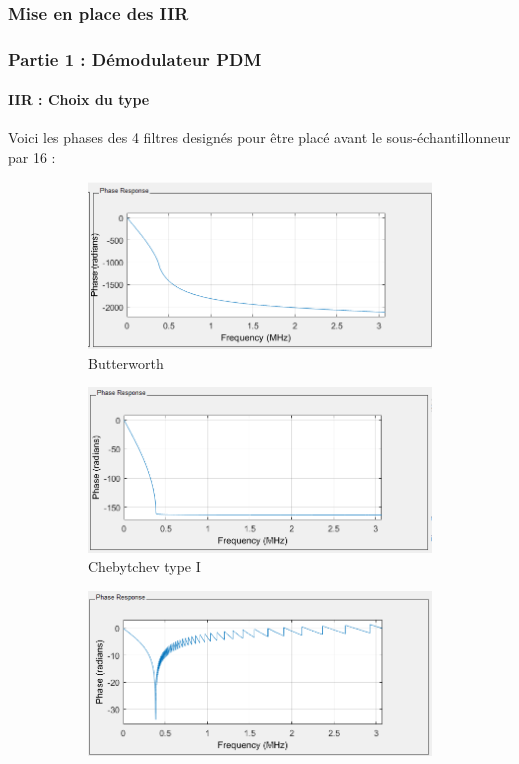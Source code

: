 \documentclass[
10pt,
aspectratio=169,
]{beamer}
\begin{document}
\subsubsection{Mise en place des IIR}
\begin{frame}
\frametitle{Partie 1 : Démodulateur PDM} 
\framesubtitle{IIR : Choix du type} 
Voici les phases des 4 filtres designés pour être placé avant le sous-échantillonneur par 16 : 
\begin{figure}
\centering
\begin{subfigure}{0.4\textwidth}
    \includegraphics[scale=0.3]{Images/Phase_IIR_butterworth.PNG}
    \caption{Butterworth}
\end{subfigure}
\hfill
\begin{subfigure}{0.4\textwidth}
    \includegraphics[scale=0.3]{Images/Phase_IIR_cheby_1.PNG}
    \caption{Chebytchev type I}
\end{subfigure}
\hfill
\begin{subfigure}{0.4\textwidth}
    \includegraphics[scale=0.3]{Images/Phase_IIR_cheby_2.PNG}

\end{subfigure}
\end{figure}
\end{frame}
\end{document}

